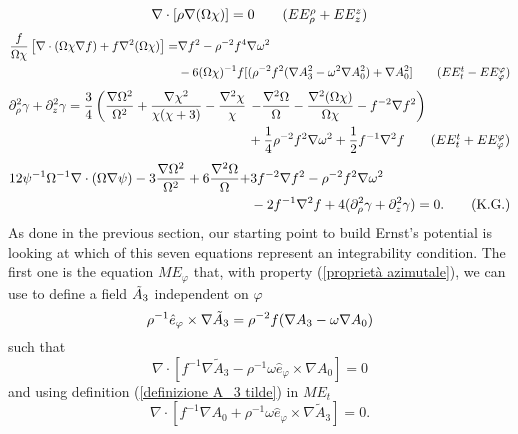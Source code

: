 \begin{equation}
    \nabla \cdot[\rho\nabla(\Omega\chi)]=0 \tag{$EE^{\rho}_{\rho}+EE^{z}_{z}$}
\end{equation}
\begin{align}
    \frac{f}{\Omega\chi}\left[\nabla\cdot(\Omega\chi\nabla f) + f\nabla^2(\Omega\chi)\right] = &\nabla f^2 - \rho^{-2}f^4\nabla\omega^2 \notag \\& -6(\Omega\chi)^{-1}f[(\rho^{-2}f^2(\nabla A_3^2-\omega^2\nabla A_0^2)+\nabla A_0^2] \tag{$EE^t_t- EE^{\varphi}_{\varphi}$}
\end{align}
\begin{align}
    \partial_{\rho}^2\gamma + \partial_z^2\gamma = \frac{3}{4}\left(\frac{\nabla\Omega^2}{\Omega^2} + \frac{\nabla\chi^2}{\chi(\chi + 3)} -\frac{\nabla^2\chi}{\chi} \right. 
    & \left. - \frac{\nabla^2\Omega}{\Omega} - \frac{\nabla^2(\Omega\chi)}{\Omega\chi} - f^{-2}\nabla f^2 \right) \notag \\
    & + \frac{1}{4}\rho^{-2}f^2\nabla\omega^2 + \frac{1}{2}f^{-1}\nabla^2f \tag{$EE^t_t + EE^{\varphi}_{\varphi}$}
\end{align}
\begin{align}
    12\psi^{-1}\Omega^{-1}\nabla\cdot(\Omega\nabla\psi)-3\frac{\nabla\Omega^2}{\Omega^2} + 6\frac{\nabla^2\Omega}{\Omega}+ &3f^{-2}\nabla f^2 - \rho^{-2}f^2\nabla\omega^2 \notag \\ 
    & -2f^{-1}\nabla^2f + 4(\partial_{\rho}^2\gamma + \partial_z^2\gamma) = 0. \tag{K.G.}
\end{align}
As done in the previous section, our starting point to build Ernst's potential is looking at which of this seven equations represent an integrability condition. The first one is the equation $ME_{\varphi}$ that, with property (\ref{proprietà azimutale}), we can use to define a field $\Tilde{A}_3$ independent on $\varphi$
\begin{equation}
    \rho^{-1}\hat{e}_{\varphi} \times \nabla \Tilde{A}_3 = \rho^{-2}f(\nabla A_3 - \omega \nabla A_0)
    \label{definizione A_3 tilde}
\end{equation}
such that
\begin{equation}
    \nabla\cdot[f^{-1}\nabla \tilde{A}_3-\rho^{-1}\omega\hat{e}_{\varphi} \times \nabla A_0]=0 
    \label{condizione per phi 1}
\end{equation}
and using definition (\ref{definizione A_3 tilde}) in $ME_t$ 
\begin{equation}
    \nabla\cdot[f^{-1}\nabla A_0+\rho^{-1}\omega\hat{e}_{\varphi} \times \nabla \tilde{A}_3]=0.
    \label{condizione per phi 2}
\end{equation}
